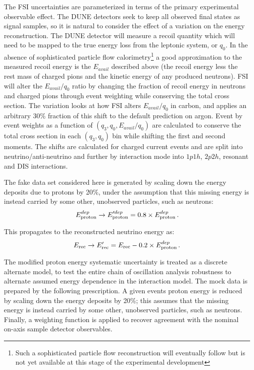 The FSI uncertainties are parameterized in terms of the primary experimental observable effect. The DUNE detectors seek to keep all observed final states as signal samples, so it is natural to consider the effect of a variation on the energy reconstruction.  The DUNE detector will measure a recoil quantity which will need to be mapped to the true energy loss from the leptonic system, or $q_0$.  In the absence of sophisticated particle flow calorimetry\footnote{Such a sophisticated particle flow reconstruction will eventually follow but is not yet available at this stage of the experimental development} a good approximation to the measured recoil energy is the $E_{avail}$ described above (the recoil energy less the rest mass of charged pions and the kinetic energy of any produced neutrons).  FSI will alter the $E_{avail}/q_0$ ratio by changing the fraction of recoil energy in neutrons and charged pions through event weighting while conserving the total cross section.
The variation looks at how FSI alters $E_{avail}/q_0$ in carbon, and applies an arbitrary 30\% fraction of this shift to the default prediction on argon.  Event by event weights as a function of $(q_3,q_0,E_{avail}/q_0)$ are calculated to conserve the total cross section in each $(q_3,q_0)$ bin while shifting the first and second moments. The shifts are calculated for charged current events and are split into neutrino/anti-neutrino and further by interaction mode into $1p1h$, $2p2h$, resonant and DIS interactions.

The fake data set considered here is generated by scaling down the energy deposits due to protons by 20\%, under the assumption that this missing energy is instead carried by some other, unobserved particles, such as neutrons:
\begin{equation}
E_{\rm proton}^{dep} \rightarrow E_{\rm proton}^{\prime dep} = 0.8 \times E_{\rm proton}^{dep} \, .
\end{equation}

This propagates to the reconstructed neutrino energy as:
\begin{equation}
E_{\rm rec} \rightarrow E_{\rm rec}^{\prime} = E_{\rm rec} - 0.2 \times E_{\rm proton}^{dep} \, .
\end{equation}

The modified proton energy systematic uncertainty is treated as a discrete alternate model, to test the entire chain of oscillation analysis robustness to alternate assumed energy dependence in the interaction model. The mock data is prepared by the following prescription. A given events proton energy is reduced by scaling down the energy deposits by 20\%; this assumes that the missing energy is instead carried by some other, unobserved particles, such as neutrons. Finally, a weighting function is applied to recover agreement with the nominal on-axis sample detector observables.


